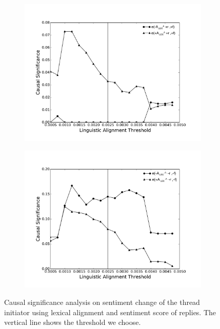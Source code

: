 \begin{figure}[!htb]
\begin{subfigure}{.5\textwidth}
  \centering
  \includegraphics[width=\linewidth]{Figures/posF05Lex20.pdf}
  \caption{\label{fig:posf05Lex}}
\end{subfigure}
\begin{subfigure}{.5\textwidth}
  \centering
  \includegraphics[width=\linewidth]{Figures/negF05Lex20.pdf}
  \caption{\label{fig:negf05Lex}}
\end{subfigure}
\caption{Causal significance analysis on sentiment change of the thread initiator using lexical alignment and sentiment score of replies. The vertical line shows the threshold we choose.}
\label{fig:Robust_Lex}
\end{figure}

